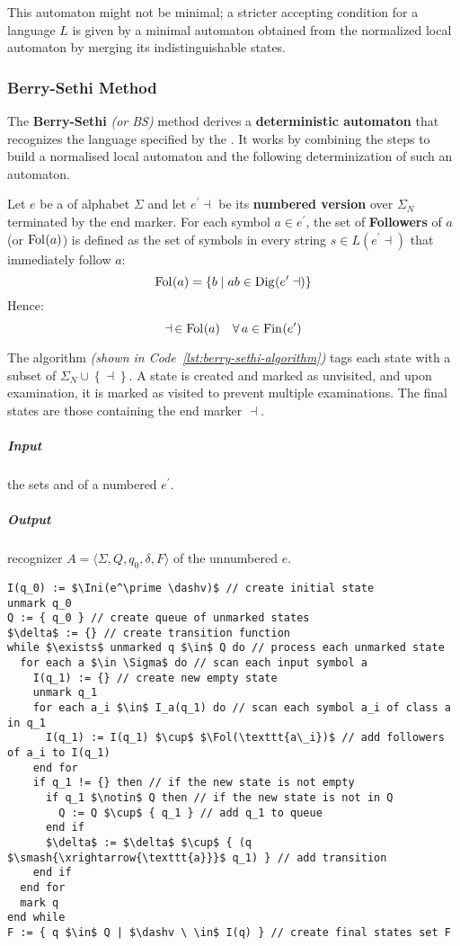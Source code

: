 \documentclass[english]{article}
\begin{document}
This automaton might not be minimal;
a stricter accepting condition for a language \(L\) is given by a minimal automaton obtained from the normalized local automaton by merging its indistinguishable states.

\subsubsection{Berry-Sethi Method}
\label{sec:berry-sethi-method}

The \textbf{Berry-Sethi} \textit{(or BS)} method derives a \textbf{deterministic automaton} that recognizes the language specified by the \re.
It works by combining the steps to build a normalised local automaton and the following determinization of such an automaton.

\bigskip
Let \(e\) be a \textbf{\re} of alphabet \(\Sigma\) and let \(e^\prime \dashv\) be its \textbf{numbered version} over \(\Sigma_N\) terminated by the end marker.
For each symbol \(a \in e^\prime\), the set of \textbf{Followers} of \(a\) (or \(\text{Fol}\hspace{0.1ex}(a)\)) is defined as the set of symbols in every string \(s \in L(e^\prime \dashv)\) that immediately follow \(a\):
\[ \text{Fol}\hspace{0.1ex}(a) = \left\{ b \mid ab \in \text{Dig}\hspace{0.1ex}(e^\prime \dashv) \right\} \]
Hence:
\[ \dashv \, \in \text{Fol}\hspace{0.1ex}(a) \quad \forall \, a \in \text{Fin}\hspace{0.1ex}(e^\prime) \]

The algorithm \textit{(shown in Code~\ref{lst:berry-sethi-algorithm})} tags each state with a subset of \(\Sigma_N \cup \left\{ \dashv \right\}\).
A state is created and marked as unvisited, and upon examination, it is marked as visited to prevent multiple examinations.
The final states are those containing the end marker \(\dashv\).

\subparagraph*{Input}
the sets \Ini and \Fol of a numbered \re \(e^\prime\).

\subparagraph*{Output}
recognizer \(A = \langle \Sigma, Q, q_0, \delta, F \rangle\) of the unnumbered \re \(e\).

\begin{lstlisting}[caption={Berry-Sethi Algorithm}, label=lst:berry-sethi-algorithm]
I(q_0) := $\Ini(e^\prime \dashv)$ // create initial state
unmark q_0
Q := { q_0 } // create queue of unmarked states
$\delta$ := {} // create transition function
while $\exists$ unmarked q $\in$ Q do // process each unmarked state
  for each a $\in \Sigma$ do // scan each input symbol a
    I(q_1) := {} // create new empty state
    unmark q_1
    for each a_i $\in$ I_a(q_1) do // scan each symbol a_i of class a in q_1
      I(q_1) := I(q_1) $\cup$ $\Fol(\texttt{a\_i})$ // add followers of a_i to I(q_1)
    end for
    if q_1 != {} then // if the new state is not empty
      if q_1 $\notin$ Q then // if the new state is not in Q
        Q := Q $\cup$ { q_1 } // add q_1 to queue
      end if
      $\delta$ := $\delta$ $\cup$ { (q $\smash{\xrightarrow{\texttt{a}}}$ q_1) } // add transition
    end if
  end for
  mark q
end while
F := { q $\in$ Q | $\dashv \ \in$ I(q) } // create final states set F
\end{lstlisting}
\end{document}
